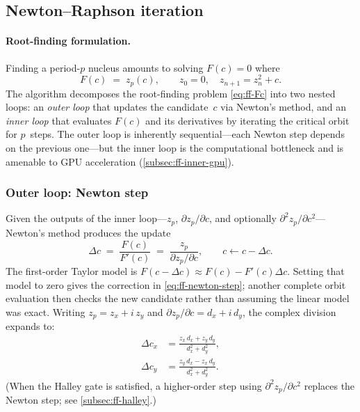 \subsection{Newton--Raphson iteration}
\label{subsec:ff-newton}

\paragraph{Root-finding formulation.}
Finding a period-$p$ nucleus amounts to solving $F(c)=0$ where
\begin{equation}\label{eq:ff-Fc}
F(c) \;=\; z_p(c),\qquad
z_0 = 0,\quad z_{n+1} = z_n^2 + c.
\end{equation}
The algorithm decomposes the root-finding problem \eqref{eq:ff-Fc} into two nested loops: an \emph{outer loop} that
updates the candidate~$c$ via Newton's method, and an \emph{inner loop} that
evaluates $F(c)$ and its derivatives by iterating the critical orbit for
$p$~steps.  The outer loop is inherently sequential---each Newton step
depends on the previous one---but the inner loop is the computational
bottleneck and is amenable to GPU acceleration
(\cref{subsec:ff-inner-gpu}).

\subsubsection{Outer loop: Newton step}
\label{subsubsec:ff-outer}

Given the outputs of the inner loop---$z_p$, $\partial z_p/\partial c$, and
optionally $\partial^2 z_p/\partial c^2$---Newton's method produces the
update
\begin{equation}\label{eq:ff-newton-step}
\Delta c \;=\; \frac{F(c)}{F'(c)}
         \;=\; \frac{z_p}{\partial z_p / \partial c},
\qquad c \leftarrow c - \Delta c.
\end{equation}
The first-order Taylor model is
$F(c-\Delta c)\approx F(c)-F'(c)\Delta c$.  Setting that model to zero
gives the correction in \eqref{eq:ff-newton-step}; another complete orbit
evaluation then checks the new candidate rather than assuming the linear
model was exact.
Writing $z_p = z_x + i\,z_y$ and $\partial z_p/\partial c = d_x + i\,d_y$,
the complex division expands to:
\begin{align}
\Delta c_x &= \frac{z_x\,d_x + z_y\,d_y}{d_x^2 + d_y^2}, \\[4pt]
\Delta c_y &= \frac{z_y\,d_x - z_x\,d_y}{d_x^2 + d_y^2}.
\end{align}
(When the Halley gate is satisfied, a higher-order step using
$\partial^2 z_p/\partial c^2$ replaces the Newton step; see
\cref{subsec:ff-halley}.)

